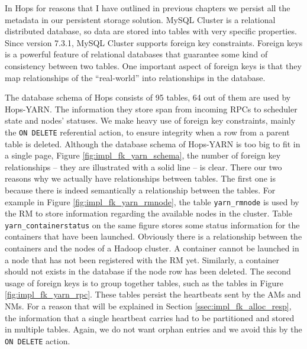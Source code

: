 In Hops for reasons that I have outlined in previous chapters we
persist all the metadata in our persistent storage solution. MySQL
Cluster is a relational distributed database, so data are stored into
tables with very specific properties. Since version 7.3.1, MySQL
Cluster supports foreign key constraints. Foreign keys is a powerful
feature of relational databases that guarantee some kind of
consistency between two tables. One important aspect of foreign keys
is that they map relationships of the ``real-world'' into
relationships in the database.

The database schema of Hops consists of 95 tables, 64 out of them are
used by Hops-YARN. The information they store span from incoming RPCs
to scheduler state and nodes' statuses. We make heavy use of foreign
key constraints, mainly the \texttt{ON DELETE} referential action, to
ensure integrity when a row from a parent table is deleted. Although
the database schema of Hops-YARN is too big to fit in
a single page, Figure \ref{fig:impl_fk_yarn_schema}, the number of
foreign key relationships -- they are illustrated with a solid line --
is clear. There our two reasons why we actually have relationships
between tables. The first one is because there is indeed semantically a
relationship between the tables. For example in Figure
\ref{fig:impl_fk_yarn_rmnode}, the table \texttt{yarn\_rmnode} is used by
the RM to store information regarding the available nodes in
the cluster. Table \texttt{yarn\_containerstatus} on the same figure
stores some status information for the containers that have been
launched. Obviously there is a relationship between the containers and
the nodes of a Hadoop cluster. A container cannot be launched in a
node that has not been registered with the RM yet. Similarly,
a container should not exists in the database if the node row has been
deleted. The second usage of foreign keys is to group together tables,
such as the tables in Figure \ref{fig:impl_fk_yarn_rpc}. These tables
persist the heartbeats sent by the AMs and NMs. For a reason that will
be explained in Section \ref{ssec:impl_fk_alloc_resp}, the information that a
single heartbeat carries had to be partitioned and stored in multiple
tables. Again, we do not want orphan entries and we avoid this by the
\texttt{ON DELETE} action.

